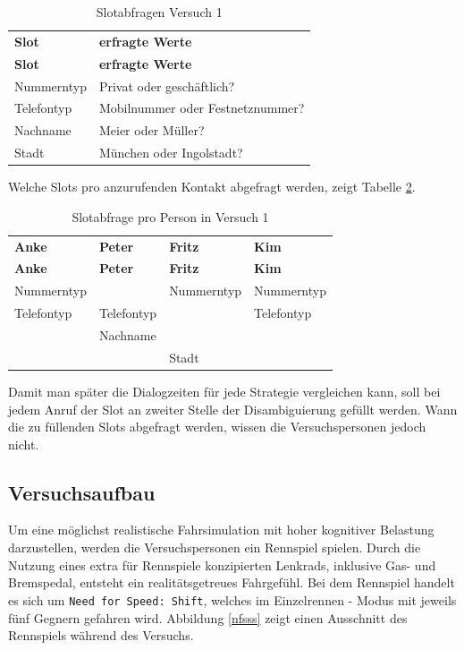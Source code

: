 \documentclass[12pt,a4paper]{scrartcl}
\begin{document}
\begin{longtable}{p{6cm}p{8cm}}
	\label{slots}\\
	\caption[Slotabfragen Versuch 1]{Slotabfragen Versuch 1}\\
	\hline
	\textbf{Slot} &	\textbf{erfragte Werte}\\
	\hline
	\endfirsthead
	\hline
	\textbf{Slot} &	\textbf{erfragte Werte}\\
	\hline
	\endhead
Nummerntyp & Privat oder geschäftlich?\\
Telefontyp & Mobilnummer oder Festnetznummer?\\
Nachname & Meier oder Müller?\\
Stadt & München oder Ingolstadt?\\


\hline
\end{longtable}
\newpage
Welche Slots pro anzurufenden Kontakt abgefragt werden, zeigt Tabelle \ref{slotsPerson}. 

\begin{longtable}{p{}p{}p{}p{}}
	\label{slotsPerson}\\
	\caption[Slotabfrage pro Person in Versuch 1]{Slotabfrage pro Person in Versuch 1}\\
	\hline
	\textbf{Anke}&\textbf{Peter}&\textbf{Fritz} &\textbf{Kim}\\
	\hline
	\endfirsthead
	\hline
	\textbf{Anke}&\textbf{Peter}&\textbf{Fritz} &\textbf{Kim}\\
	\hline
	\endhead
Nummerntyp & & Nummerntyp & Nummerntyp\\
Telefontyp & Telefontyp & & Telefontyp \\
& Nachname & & \\
& & Stadt & \\

\hline
\end{longtable}

Damit man später die Dialogzeiten für jede Strategie vergleichen kann, soll bei jedem Anruf der Slot an zweiter Stelle der Disambiguierung gefüllt werden. Wann die zu füllenden Slots abgefragt werden, wissen die Versuchspersonen jedoch nicht.  

\subsection{Versuchsaufbau}
Um eine möglichst realistische Fahrsimulation mit hoher kognitiver Belastung darzustellen, werden die Versuchspersonen ein Rennspiel spielen. Durch die Nutzung eines extra für Rennspiele konzipierten Lenkrads, inklusive Gas- und Bremspedal, entsteht ein realitätsgetreues Fahrgefühl. Bei dem Rennspiel handelt es sich um \texttt{Need for Speed: Shift}, welches im Einzelrennen - Modus mit jeweils fünf Gegnern gefahren wird. Abbildung \ref{nfsss} zeigt einen Ausschnitt des Rennspiels während des Versuchs. 
\end{document}
